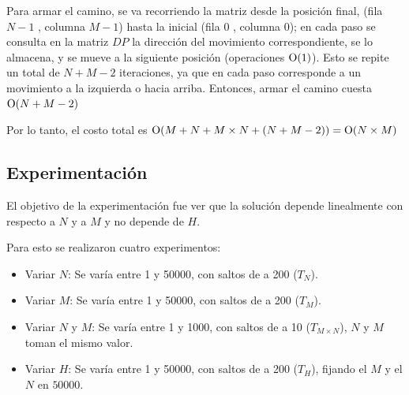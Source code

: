     Para armar el camino, se va recorriendo la matriz desde la posición final, (fila $N - 1$ , columna $M - 1$) hasta la inicial (fila $0$ , columna $0$); en cada paso se consulta en la matriz $DP$ la dirección del movimiento correspondiente, se lo almacena, y se mueve a la siguiente posición (operaciones $\operatorname{O}(1)$). Esto se repite un total de $N + M - 2$ iteraciones, ya que en cada paso corresponde a un movimiento a la izquierda o hacia arriba. Entonces, armar el camino cuesta $\operatorname{O}(N + M - 2)$

    Por lo tanto, el costo total es $\operatorname{O}( M + N + M \times N + (N + M - 2) ) = \operatorname{O}(N \times M)$

    \subsection{Experimentación}
    El objetivo de la experimentación fue ver que la solución depende linealmente con respecto a $N$ y a $M$ y no depende de $H$.

    Para esto se realizaron cuatro experimentos:
    \begin{itemize}
        \item Variar $N$: Se varía entre 1 y 50000, con saltos de a 200 ($T_N$).
        \item Variar $M$: Se varía entre 1 y 50000, con saltos de a 200 ($T_M$).
        \item Variar $N$ y $M$: Se varía entre 1 y 1000, con saltos de a 10 ($T_{M \times N}$), $N$ y $M$ toman el mismo valor.
        \item Variar $H$: Se varía entre 1 y 50000, con saltos de a 200 ($T_H$), fijando el $M$ y el $N$ en $50000$.
    \end{itemize}

    \begin{figure}[H]
        \centering
        \caption{}
        \label{fig:exp3:var-nym-base}
    \end{figure}


